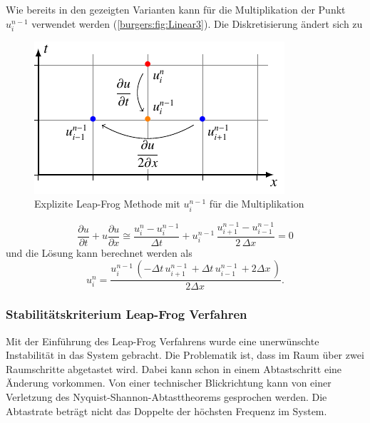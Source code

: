 	Wie bereits in den gezeigten Varianten kann f\"ur die Multiplikation der Punkt $u_{i}^{n-1}$ verwendet werden (\autoref{burgers:fig:Linear3}).
	Die Diskretisierung \"andert sich zu

	\begin{figure}
	\centering
	\includegraphics[height=.4\textwidth]{papers/burgers/BurgersEquation/tikz/linear3/linear3.pdf}
	\caption{Explizite Leap-Frog Methode mit  $u_{i}^{n-1}$ f\"ur die Multiplikation}
	\label{burgers:fig:Linear3}
	\end{figure}



	\begin{equation}
		\frac {\partial u}{\partial t}+u{\frac {\partial u}{\partial x}} \cong \frac{u_{i}^{n}-u_{i}^{n-1}}{\Delta t}+ u_{i}^{n-1}\, \frac{u_{i+1}^{n-1}-u_{i-1}^{n-1}}{2\,\Delta x}=0
		\label{burgers:eq_ex_lf1}
	\end{equation}
 	und die L\"osung kann berechnet werden als
	\begin{equation}
	 u_{i}^{n} = \frac{u^{n-1}_{i}\, \left(- \Delta{t}\, u^{n-1}_{i+1}\, + \Delta{t}\, u^{n-1}_{i-1}\, + 2 \Delta{x}\,\right)}{2 \Delta{x}\,}.
		\label{burgers:eq_ex_sol_lf1}
	\end{equation}



\subsubsection{Stabilit\"atskriterium Leap-Frog Verfahren}
	Mit der Einf\"uhrung des Leap-Frog Verfahrens wurde eine unerw\"unschte Instabilit\"at in das System gebracht.
	Die Problematik ist, dass im Raum über zwei Raumschritte abgetastet wird.
	Dabei kann schon in einem Abtastschritt eine Änderung vorkommen.
	Von einer technischer Blickrichtung kann von einer Verletzung des Nyquist-Shannon-Abtasttheorems gesprochen werden.
	Die Abtastrate beträgt nicht das Doppelte der höchsten Frequenz im System.

